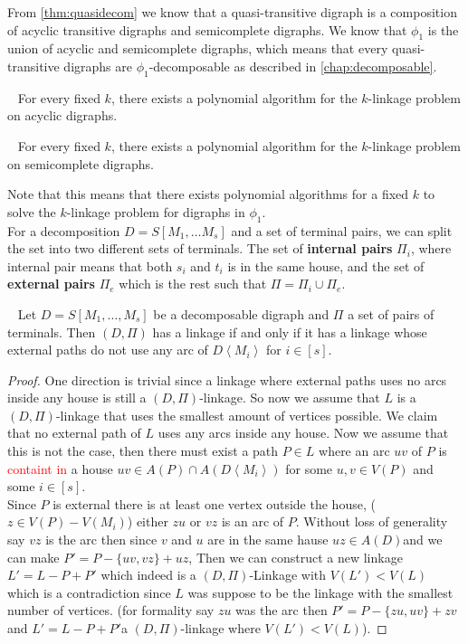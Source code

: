From \autoref{thm:quasidecom} we know that a quasi-transitive digraph is a composition of acyclic transitive digraphs and semicomplete digraphs.
We know that $\phi_1$ is the union of acyclic and semicomplete digraphs, which means that every quasi-transitive digraphs are $\phi_1$-decomposable as described in \autoref{chap:decomposable}. 
\begin{thm}~\cite{bangJGT85}
    For every fixed $k$, there exists a polynomial algorithm for the $k$-linkage problem on acyclic digraphs.
    \label{thm:acyclicklink}
\end{thm}
\begin{thm}~\cite{chudnovskyAM270}
    For every fixed $k$, there exists a polynomial algorithm for the $k$-linkage problem on semicomplete digraphs.
    \label{thm:semiklink}
\end{thm}
Note that this means that there exists polynomial algorithms for a fixed $k$ to solve the $k$-linkage problem for digraphs in $\phi_1$.\\
For a decomposition $D=S[M_1,\dots M_s]$ and a set of terminal pairs, we can split the set into two different sets of terminals. 
The set of \textbf{internal pairs} $\Pi_i$, where internal pair means that both $s_i$ and $t_i$ is in the same house, and the set of \textbf{external pairs} $\Pi_e$ which is the rest such that $\Pi=\Pi_i \cup \Pi_e$.\\
\begin{lemma}~\cite{bangJGT85}
    Let $D=S[M_1,\dots ,M_s]$ be a decomposable digraph and $\Pi$ a set of pairs of terminals. Then $(D,\Pi)$ has a linkage if and only if it has a linkage whose external paths do not use any arc of $D\left<M_i\right>$ for $i\in [s]$.
    \label{lemma:externalhouse}
\end{lemma}
\begin{proof}
    One direction is trivial since a linkage where external paths uses no arcs inside any house is still a $(D,\Pi)$-linkage.
    So now we assume that $L$ is a $(D,\Pi)$-linkage that uses the smallest amount of vertices possible. 
    We claim that no external path of $L$ uses any arcs inside any house. 
    Now we assume that this is not the case, then there must exist a path $P\in L$ where an arc $uv$ of $P$ is \textcolor{red}{containt in} a house $uv\in A(P)\cap A(D\left<M_i\right>)$ for some $u,v\in V(P)$ and some $i\in [s]$.\\
    Since $P$ is external there is at least one vertex outside the house, ($z\in V(P)-V(M_i)$) either $zu$ or $vz$ is an arc of $P$.
    Without loss of generality say $vz$ is the arc then since $v$ and $u$ are in the same hause $uz\in A(D)$and we can make $P'=P-\lbrace uv,vz\rbrace + uz$, Then we can construct a new linkage $L'=L-P+P'$ which indeed is a $(D,\Pi)$-Linkage with $V(L')<V(L)$ which is a contradiction since $L$ was suppose to be the linkage with the smallest number of vertices. 
    (for formality say $zu$ was the arc then $P'=P-\lbrace zu,uv\rbrace +zv$ and $L'=L-P+P'$a $(D,\Pi)$-linkage where $V(L')<V(L)$).
\end{proof}
